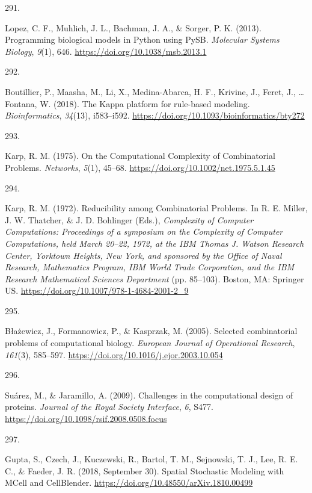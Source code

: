 \documentclass[
  11pt,
  letterpaper,
]{scrreprt}
\newlength{\cslhangindent}
\newlength{\csllabelwidth}
\newenvironment{CSLReferences}[2] %
 {\begin{list}{}{%
  \setlength{\itemindent}{0pt}
  \setlength{\leftmargin}{0pt}
  \setlength{\parsep}{0pt}
  \ifodd #1
   \setlength{\leftmargin}{\cslhangindent}
   \setlength{\itemindent}{-1\cslhangindent}
  \fi
  \setlength{\itemsep}{#2\baselineskip}}}
 {\end{list}}
\newcommand{\CSLLeftMargin}[1]{\parbox[t]{\csllabelwidth}{\strut#1\strut}}
\newcommand{\CSLRightInline}[1]{\parbox[t]{\linewidth - \csllabelwidth}{\strut#1\strut}}
\begin{document}
\begin{CSLReferences}{0}{0}
\CSLLeftMargin{291. }%
\CSLRightInline{Lopez, C. F., Muhlich, J. L., Bachman, J. A., \& Sorger,
P. K. (2013). Programming biological models in {Python} using {PySB}.
\emph{Molecular Systems Biology}, \emph{9}(1), 646.
\url{https://doi.org/10.1038/msb.2013.1}}

\CSLLeftMargin{292. }%
\CSLRightInline{Boutillier, P., Maasha, M., Li, X., Medina-Abarca, H.
F., Krivine, J., Feret, J., \ldots{} Fontana, W. (2018). The {Kappa}
platform for rule-based modeling. \emph{Bioinformatics}, \emph{34}(13),
i583--i592. \url{https://doi.org/10.1093/bioinformatics/bty272}}

\CSLLeftMargin{293. }%
\CSLRightInline{Karp, R. M. (1975). On the {Computational Complexity} of
{Combinatorial Problems}. \emph{Networks}, \emph{5}(1), 45--68.
\url{https://doi.org/10.1002/net.1975.5.1.45}}

\CSLLeftMargin{294. }%
\CSLRightInline{Karp, R. M. (1972). Reducibility among {Combinatorial
Problems}. In R. E. Miller, J. W. Thatcher, \& J. D. Bohlinger (Eds.),
\emph{Complexity of {Computer Computations}: {Proceedings} of a
symposium on the {Complexity} of {Computer Computations}, held {March}
20--22, 1972, at the {IBM Thomas J}. {Watson Research Center}, {Yorktown
Heights}, {New York}, and sponsored by the {Office} of {Naval Research},
{Mathematics Program}, {IBM World Trade Corporation}, and the {IBM
Research Mathematical Sciences Department}} (pp. 85--103). Boston, MA:
Springer US. \url{https://doi.org/10.1007/978-1-4684-2001-2_9}}

\CSLLeftMargin{295. }%
\CSLRightInline{Błażewicz, J., Formanowicz, P., \& Kasprzak, M. (2005).
Selected combinatorial problems of computational biology. \emph{European
Journal of Operational Research}, \emph{161}(3), 585--597.
\url{https://doi.org/10.1016/j.ejor.2003.10.054}}

\CSLLeftMargin{296. }%
\CSLRightInline{Suárez, M., \& Jaramillo, A. (2009). Challenges in the
computational design of proteins. \emph{Journal of the Royal Society
Interface}, \emph{6}, S477.
\url{https://doi.org/10.1098/rsif.2008.0508.focus}}

\CSLLeftMargin{297. }%
\CSLRightInline{Gupta, S., Czech, J., Kuczewski, R., Bartol, T. M.,
Sejnowski, T. J., Lee, R. E. C., \& Faeder, J. R. (2018, September 30).
Spatial {Stochastic Modeling} with {MCell} and {CellBlender}.
\url{https://doi.org/10.48550/arXiv.1810.00499}}


\end{CSLReferences}
\end{document}
